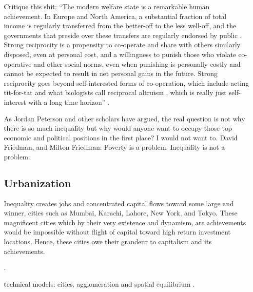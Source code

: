 \documentclass[12pt]{article}
\newcommand{\1}{\mathbbm 1}
\begin{document}
	Critique this shit:	``The modern welfare state is a remarkable human achievement.
		In Europe and North America, a substantial fraction of
		total income is regularly transferred from the better-off to the
		less well-off, and the governments that preside over these
		transfers are regularly endorsed by public \cite{atkinson2015inequality}.
		Strong reciprocity is a propensity to co-operate and
		share with others similarly disposed, even at personal cost,
		and a willingness to punish those who violate co-operative
		and other social norms, even when punishing is personally
		costly and cannot be expected to result in net personal gains
		in the future. Strong reciprocity goes beyond self-interested
		forms of co-operation, which include acting tit-for-tat and
		what biologists call reciprocal altruism \cite{trivers1971evolution},
		which is really just self-interest with a long time horizon'' \cite{bowles2012new}.
		
		
		
		
		
		
		As Jordan Peterson and other scholars have argued, the real question is not why there is so much inequality but why would anyone want to occupy those top economic and political positions in the first place? I would not want to. David Friedman, and Milton Friedman: Poverty is a problem. Inequality is not a problem.
		
		
		
		

		
		\subsection{Urbanization}
		
		
		Inequality creates jobs and concentrated capital flows toward some large and winner, cities such as Mumbai, Karachi, Lahore, New York, and Tokyo. These magnificent cities which by their very existence and dynamism, are achievements would be impossible without flight of capital toward high return investment locations. Hence, these cities owe their grandeur to capitalism and its achievements.
		
		\cite{glaeser2013triumph}.
		
		technical models: cities, agglomeration and spatial equilibrium \cite{glaeser2008cities}.
		
\end{document}
